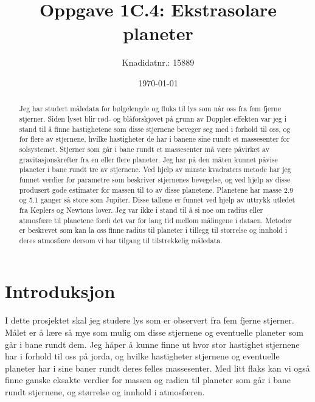 \documentclass[english,notitlepage]{revtex4-1}  %
\begin{document}
\title{Oppgave 1C.4: Ekstrasolare planeter}
\date{\today}
\author{Knadidatnr.: 15889}


\newpage

\begin{abstract}
Jeg har studert måledata for bølgelengde og fluks til lys som når oss fra fem fjerne
 stjerner. Siden lyset blir rød- og blåforskjøvet på grunn av Doppler-effekten var jeg i stand til å finne hastighetene som disse stjernene beveger seg med i forhold til oss, og for flere av stjernene, hvilke hastigheter de har i banene sine rundt et massesenter for solsystemet. Stjerner som går i bane rundt et massesenter må være påvirket av gravitasjonskrefter fra en eller flere planeter. Jeg har på den måten kunnet påvise planeter i bane rundt tre av stjernene. Ved hjelp av minste kvadraters metode har jeg funnet verdier for parametre som beskriver stjernenes bevegelse, og ved hjelp av disse produsert gode estimater for massen til to av disse planetene. Planetene har masse 2.9 og 5.1 ganger så store som Jupiter. Disse tallene er funnet ved hjelp av uttrykk utledet fra Keplers og Newtons lover. Jeg var ikke i stand til å si noe om radius eller atmosfære til planetene fordi det var for lang tid mellom målingene i dataen. Metoder er beskrevet som kan la oss finne radius til planeter i tillegg til størrelse og innhold i deres atmosfære dersom vi har tilgang til tilstrekkelig måledata. 


\end{abstract}
\maketitle                                %



\section{Introduksjon}
\label{sect:intro}

I dette prosjektet skal jeg studere lys som er observert fra fem fjerne stjerner. Målet
 er å lære så mye som mulig om disse stjernene og eventuelle planeter som går i bane rundt dem. Jeg håper å kunne finne ut hvor stor hastighet stjernene har i forhold til oss på jorda, og hvilke hastigheter stjernene og eventuelle planeter har i sine baner rundt deres felles massesenter. Med litt flaks kan vi også finne ganske eksakte verdier for massen og radien til planeter som går i bane rundt stjernene, og størrelse og innhold i atmosfæren.
\end{document}
